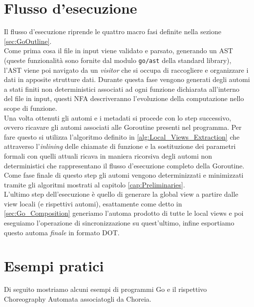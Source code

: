 \section{Flusso d'esecuzione}
Il flusso d'esecuzione riprende le quattro macro fasi definite nella sezione \ref{sec:GoOutline}.\bigskip\\
Come prima cosa il file in input viene validato e parsato, generando un AST (queste funzionalità sono fornite dal modulo \texttt{go/ast} della standard library), l'AST viene poi navigato da un \emph{visitor} che si occupa di raccogliere e organizzare i dati in apposite strutture dati. Durante questa fase vengono generati degli automi a stati finiti non deterministici associati ad ogni funzione dichiarata all'interno del file in input, questi NFA descriveranno l'evoluzione della computazione nello scope di funzione.\bigskip\\
Una volta ottenuti gli automi e i metadati si procede con lo step successivo, ovvero ricavare gli automi associati alle Goroutine presenti nel programma. Per fare questo si utilizza l'algoritmo definito in \ref{alg:Local_Views_Extraction} che attraverso l'\emph{inlining} delle chiamate di funzione e la sostituzione dei parametri formali con quelli attuali ricava in maniera ricorsiva degli automi non deterministici che rappresentano il flusso d'esecuzione completo della Goroutine. Come fase finale di questo step gli automi vengono determinizzati e minimizzati tramite gli algoritmi mostrati al capitolo \ref{cap:Preliminaries}.\bigskip\\
L'ultimo step dell'esecuzione è quello di generare la global view a partire dalle view locali (e rispettivi automi), esattamente come detto in \ref{sec:Go_Composition} generiamo l'automa prodotto di tutte le local views e poi eseguiamo l'operazione di sincronizzazione su quest'ultimo, infine esportiamo questo automa \emph{finale} in formato DOT.

\section{Esempi pratici}
Di seguito mostriamo alcuni esempi di programmi Go e il rispettivo Choreography Automata associatogli da Choreia. %


